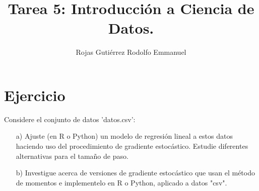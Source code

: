 \documentclass[10.5pt,notitlepage]{article}
\title{Tarea 5: Introducción a Ciencia de Datos.}
\author{Rojas Gutiérrez Rodolfo Emmanuel}
\theoremstyle{plain}
\begin{document}
\maketitle
\section{Ejercicio}

\setcounter{exo}{0}
\begin{exo}
Considere el conjunto de datos 'datos.csv':
\begin{itemize}
    \item[a)] Ajuste (en R o Python) un modelo de regresión lineal a estos datos haciendo uso del procedimiento de gradiente estocástico. Estudie diferentes alternativas para el tamaño de paso. 
    \item[b)] Investigue acerca de versiones de gradiente estocástico que usan el método de momentos e implementelo en R o Python, aplicado a datos "csv".
\end{itemize}
\end{exo}
\end{document}
